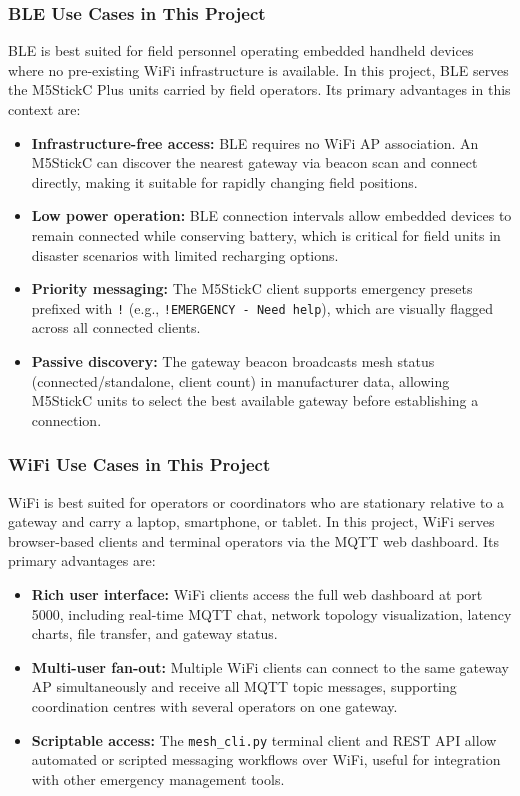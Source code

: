 \documentclass[conference]{IEEEtran}
\begin{document}
\subsubsection{BLE Use Cases in This Project}
BLE is best suited for field personnel operating embedded handheld devices where no pre-existing WiFi infrastructure is available. In this project, BLE serves the M5StickC Plus units carried by field operators. Its primary advantages in this context are:
\begin{itemize}
    \item \textbf{Infrastructure-free access:} BLE requires no WiFi AP association. An M5StickC can discover the nearest gateway via beacon scan and connect directly, making it suitable for rapidly changing field positions.
    \item \textbf{Low power operation:} BLE connection intervals allow embedded devices to remain connected while conserving battery, which is critical for field units in disaster scenarios with limited recharging options.
    \item \textbf{Priority messaging:} The M5StickC client supports emergency presets prefixed with \texttt{!} (e.g., \texttt{!EMERGENCY - Need help}), which are visually flagged across all connected clients.
    \item \textbf{Passive discovery:} The gateway beacon broadcasts mesh status (connected/standalone, client count) in manufacturer data, allowing M5StickC units to select the best available gateway before establishing a connection.
\end{itemize}

\subsubsection{WiFi Use Cases in This Project}
WiFi is best suited for operators or coordinators who are stationary relative to a gateway and carry a laptop, smartphone, or tablet. In this project, WiFi serves browser-based clients and terminal operators via the MQTT web dashboard. Its primary advantages are:
\begin{itemize}
    \item \textbf{Rich user interface:} WiFi clients access the full web dashboard at port 5000, including real-time MQTT chat, network topology visualization, latency charts, file transfer, and gateway status.
    \item \textbf{Multi-user fan-out:} Multiple WiFi clients can connect to the same gateway AP simultaneously and receive all MQTT topic messages, supporting coordination centres with several operators on one gateway.
    \item \textbf{Scriptable access:} The \texttt{mesh\_cli.py} terminal client and REST API allow automated or scripted messaging workflows over WiFi, useful for integration with other emergency management tools.
\end{itemize}
\end{document}
